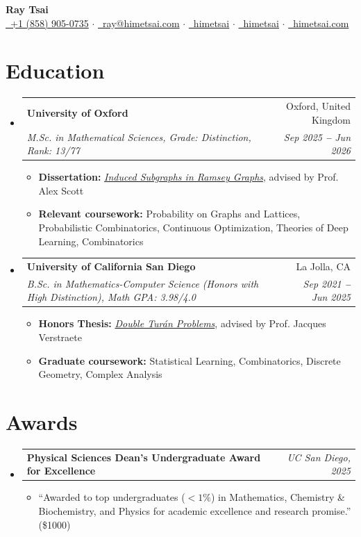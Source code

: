 \documentclass[letterpaper,11pt]{article}
\makeatletter
\newcommand{\resumeItem}[1]{
  \item\small{
    {#1 \vspace{-1pt}}
  }
}
\newcommand{\resumeSubSubheading}[2]{
    \vspace{-2pt}\item
    \begin{tabular*}{0.97\textwidth}{l@{\extracolsep{\fill}}r}
      \textbf{\small#1} & \textit{\small #2} \\
    \end{tabular*}\vspace{-5pt}
}
\newcommand{\resumeEducationHeading}[4]{
  \vspace{-2pt}\item
    \begin{tabular*}{0.97\textwidth}[t]{l@{\extracolsep{\fill}}r}
      \textbf{#1} & #2 \\
      \textit{\small#3} & \textit{\small #4} \\
    \end{tabular*}\vspace{-5pt}
}
\newcommand{\resumeSubHeadingListStart}{\begin{itemize}[leftmargin=0.15in, label={}]}
\newcommand{\resumeSubHeadingListEnd}{\end{itemize}}
\newcommand{\resumeItemListStart}{\begin{itemize}\vspace{-2pt}}
\newcommand{\resumeItemListEnd}{\end{itemize}\vspace{-7pt}}
\makeatother
\begin{document}

\begin{center}
  \textbf{\Huge Ray Tsai} \\
  \vspace{8pt}
  \small
  \href{tel:18589050735}{\faPhone*\ +1 (858) 905-0735}
  $\cdot$
  \href{mailto:ray@himetsai.com}{\faEnvelope\ ray@himetsai.com}
  $\cdot$
  \href{https://github.com/himetsai}{\faGithub\ himetsai}
  $\cdot$
  \href{https://www.linkedin.com/in/himetsai}{\faLinkedin\ himetsai}
  $\cdot$
  \href{https://himetsai.com}{\faGlobe\ himetsai.com}
\end{center}


\section{Education}
\resumeSubHeadingListStart

  \resumeEducationHeading{University of Oxford}{Oxford, United Kingdom}{M.Sc. in Mathematical Sciences, Grade: Distinction, Rank: 13/77}{Sep 2025 \textbf{--} Jun 2026}
  \resumeItemListStart
    \resumeItem{\textbf{Dissertation:} \href{https://himetsai.com/omms_diss.pdf}{\textit{Induced Subgraphs in Ramsey Graphs}}, advised by Prof. Alex Scott}
    \resumeItem{\textbf{Relevant coursework:} Probability on Graphs and Lattices, Probabilistic Combinatorics, Continuous Optimization, Theories of Deep Learning, Combinatorics}
  \resumeItemListEnd

  \vspace{3pt}

  \resumeEducationHeading{University of California San Diego}{La Jolla, CA}{B.Sc. in Mathematics-Computer Science (Honors with High Distinction), Math GPA: 3.98/4.0}{Sep 2021 \textbf{--} Jun 2025}
  \resumeItemListStart
    \resumeItem{\textbf{Honors Thesis:} \href{https://himetsai.com/thesis.pdf}{\textit{Double Turán Problems}}, advised by Prof. Jacques Verstraete}
    \resumeItem{\textbf{Graduate coursework:} Statistical Learning, Combinatorics, Discrete Geometry, Complex Analysis}
  \resumeItemListEnd

\resumeSubHeadingListEnd


\section{Awards}
\resumeSubHeadingListStart
  \resumeSubSubheading{Physical Sciences Dean's Undergraduate Award for Excellence}{UC San Diego, 2025}
  \resumeItemListStart
    \resumeItem{``Awarded to top undergraduates ($<1\%$) in Mathematics, Chemistry \& Biochemistry, and Physics for academic excellence and research promise.'' (\$1000)}
  \resumeItemListEnd
\resumeSubHeadingListEnd
\end{document}
